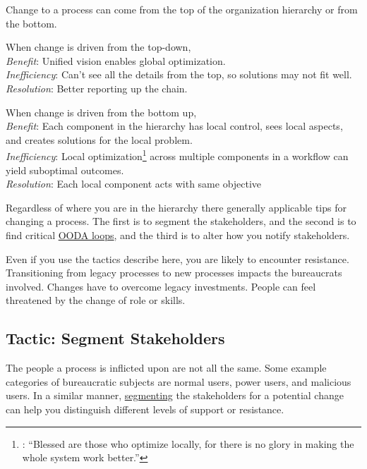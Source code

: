 Change to a process can come from the top of the organization hierarchy or from the bottom. 

When change is driven from the top-down,\\
\textit{Benefit}: Unified vision enables global optimization.\\
\textit{Inefficiency}: Can't see all the details from the top, so solutions may not fit well.\\
\textit{Resolution}: Better reporting up the chain.

When change is driven from the bottom up,\\
\textit{Benefit}: Each component in the hierarchy has local control, sees local aspects, and creates solutions for the local problem.\\
\textit{Inefficiency}: Local optimization\footnote{
\cite{1996_unknown}: ``Blessed are those who optimize locally, for there is no glory in making the whole system work better.''} across multiple components in a workflow can yield suboptimal outcomes.\\
\textit{Resolution}: Each local component acts with same objective

Regardless of where you are in the hierarchy there generally applicable tips for changing a process. The first is to segment the stakeholders, and the second is to find critical \href{https://en.wikipedia.org/wiki/OODA_loop}{OODA loops},
 and the third is to alter how you notify stakeholders.

Even if you use the tactics describe here, you are likely to encounter resistance. 
Transitioning from legacy processes to new processes impacts the bureaucrats involved. Changes have to overcome legacy investments. People can feel threatened by the change of role or skills.  

\subsection*{Tactic: Segment Stakeholders}

The people a process is inflicted upon are not all the same. Some example categories of bureaucratic subjects are
normal users, power users, and malicious users.
In a similar manner, 
\href{https://en.wikipedia.org/wiki/Market_segmentation}{segmenting}
\iftoggle{WPinmargin}{\marginpar{[Wikipedia] market\\segmentation}}{}
the stakeholders for a potential change can help you distinguish different levels of support or resistance. 

